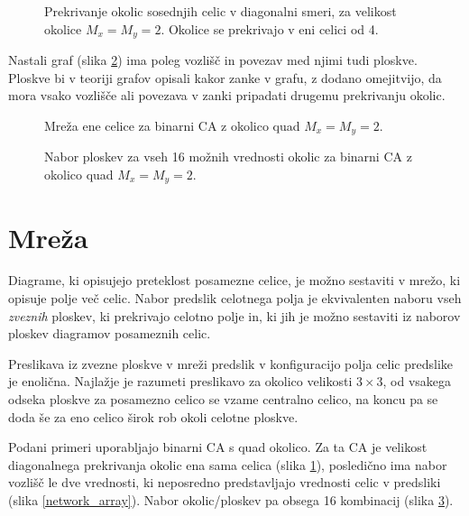 \documentclass[12pt,a4paper,openany,twoside]{book}
\begin{document}
\begin{figure}[htb]
\centerline{}
\caption[Prekrivanje okolic \(2 \times 2\) - diagonalno.]
{Prekrivanje okolic sosednjih celic v diagonalni smeri, za velikost okolice \(M_x=M_y=2\).
Okolice se prekrivajo v eni celici od 4.}
\label{overlap_diagonal_quad}
\end{figure}

Nastali graf (slika \ref{network_single}) ima poleg vozlišč in povezav med njimi tudi ploskve.
Ploskve bi v teoriji grafov opisali kakor zanke v grafu, z dodano omejitvijo,
da mora vsako vozlišče ali povezava v zanki pripadati drugemu prekrivanju okolic.

\begin{figure}[htb]
\centerline{}
\caption[Mreža ene celice.]{Mreža ene celice za binarni CA z okolico quad \(M_x=M_y=2\).}
\label{network_single}
\end{figure}

\begin{figure}[htb]
\centerline{}
\caption[Nabor ploskev.]{Nabor ploskev za vseh 16 možnih vrednosti okolic za binarni CA z okolico quad \(M_x=M_y=2\).}
\label{neighborhood_surfaces}
\end{figure}

\section{Mreža}

Diagrame, ki opisujejo preteklost posamezne celice, je možno sestaviti v mrežo,
ki opisuje polje več celic. Nabor predslik celotnega polja je ekvivalenten naboru
vseh \textit{zveznih} ploskev, ki prekrivajo celotno polje in, ki jih je možno sestaviti iz
naborov ploskev diagramov posameznih celic.

Preslikava iz zvezne ploskve v mreži predslik v konfiguracijo polja celic predslike je enolična.
Najlažje je razumeti preslikavo za okolico velikosti \(3 \times 3\),
od vsakega odseka ploskve za posamezno celico se vzame centralno celico,
na koncu pa se doda še za eno celico širok rob okoli celotne ploskve.

Podani primeri uporabljajo binarni CA s quad okolico.
Za ta CA je velikost diagonalnega prekrivanja okolic ena sama celica (slika \ref{overlap_diagonal_quad}),
posledično ima nabor vozlišč le dve vrednosti, ki neposredno predstavljajo
vrednosti celic v predsliki (slika \ref{network_array}).
Nabor okolic/ploskev pa obsega 16 kombinacij (slika \ref{neighborhood_surfaces}).
\end{document}
